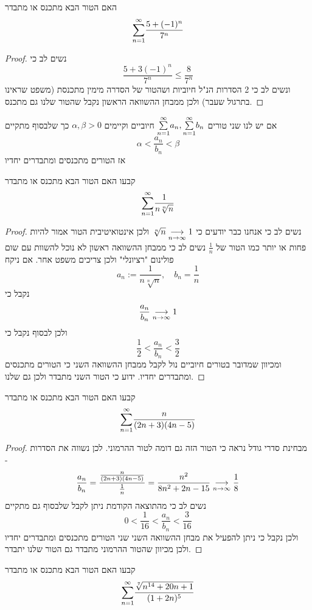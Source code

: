 \documentclass{article}
\begin{document}
\begin{exercise}
האם הטור הבא מתכנס או מתבדר
 \[\overset{\infty}{\underset{n=1}{\sum}}\frac{5+(-1)^n}{7^n}\]
\end{exercise}

\begin{proof}
נשים לב כי 
\[\frac{5+3(-1)^n}{7^n}\leq \frac{8}{7^n}\]
ונשים לב כי 2 הסדרות הנ"ל חיוביות ושהטור של הסדרה מימין מתכנסת (משפט שראינו בתרגול שעבר) ולכן ממבחן ההשוואה הראשון נקבל שהטור שלנו גם מתכנס.
\end{proof}

\begin{theorem}
אם יש לנו שני טורים 
$\overset{\infty}{\underset{n=1}{\sum}} a_n, \overset{\infty}{\underset{n=1}{\sum}} b_n$
חיוביים וקיימים 
$\alpha,\beta>0$
כך שלבסוף מתקיים 
\[\alpha<\frac{a_n}{b_n}<\beta\]
אז הטורים מתכנסים ומתבדרים יחדיו
\end{theorem}

\begin{exercise}
 קבעו האם הטור הבא מתכנס או מתבדר
\[\overset{\infty}{\underset{n=1}{\sum}} \frac{1}{n\sqrt[n]{n}}\]
\end{exercise}

\begin{proof}
נשים לב כי אנחנו כבר יודעים כי
$\sqrt[n]{n}\underset{n\rightarrow\infty}{\longrightarrow} 1$
ולכן אינטואיטיבית הטור אמור להיות פחות או יותר כמו הטור של 
$\frac{1}{n}$
נשים לב כי ממבחן ההשוואה ראשון לא נוכל להשוות עם שום פולינום "רציונלי" ולכן צריכים משפט אחר. אם ניקח 
\[a_n:=\frac{1}{n\sqrt[n]{n}}, \quad b_n = \frac{1}{n}\]
נקבל כי 
\[\frac{a_n}{b_n}\underset{n\rightarrow\infty}{\longrightarrow} 1\]
ולכן לבסוף נקבל כי 
\[\frac{1}{2}<\frac{a_n}{b_n}<\frac{3}{2}\]
ומכיוון שמדובר בטורים חיוביים נול לקבל ממבחן ההשוואה השני כי הטורים מתכנסים ומתבדרים יחדיו. ידוע כי הטור השני מתבדר ולכן גם שלנו.
\end{proof}

\begin{exercise}
קבעו האם הטור הבא מתכנס או מתבדר
\[\overset{\infty}{\underset{n=1}{\sum}} \frac{n}{(2n+3)(4n-5)}\]
\end{exercise}

\begin{proof}
מבחינת סדרי גודל נראה כי הטור הזה גם דומה לטור ההרמוני. לכן נשווה את הסדרות - 
\[\frac{a_n}{b_n} = \frac{\frac{n}{(2n+3)(4n-5)}}{\frac{1}{n}} = \frac{n^2}{8n^2+2n-15}\underset{n\rightarrow\infty}{\longrightarrow} \frac{1}{8}\]
נשים לב כי מהתוצאה הקודמת ניתן לקבל שלבסוף גם מתקיים
\[0<\frac{1}{16}<\frac{a_n}{b_n}<\frac{3}{16}\]
ולכן נקבל כי ניתן להפעיל את מבחן ההשוואה השני שני הטורים מתכנסים ומתבדרים יחדיו ולכן מכיוון שהטור ההרמוני מתבדר גם הטור שלנו יתבדר.
\end{proof}

\begin{exercise}
 קבעו האם הטור הבא מתכנס או מתבדר
 \[\overset{\infty}{\underset{n=1}{\sum}}\frac{\sqrt[7]{n^{14}+20n+1}}{(1+2n)^5}\]
\end{exercise}
\end{document}
